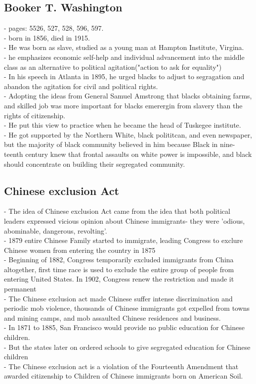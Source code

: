 \documentclass{article}
\begin{document}
\subsection{ Booker T. Washington}
- pages: 5526, 527, 528, 596, 597.\\
- born in 1856, died in 1915.\\
- He was born as slave, studied as a young man at Hampton Institute, Virgina.\\
- he emphasizes economic self-help and individual advancement into the middle class as an alternative to political agitation("action to ask for equality")\\
- In his speech in Atlanta in 1895, he urged blacks to adjust to segragation and abandon the agitation for civil and political rights.\\
-  Adopting the ideas from General Samuel Amstrong that blacks obtaining farms, and skilled job was more important for blacks emerergin from slavery than the rights of citizenship.\\
- He put this view to practice when he became the head of Tuskegee institute.\\
- He got supported by the Northern White, black polititcan, and even newspaper, but the majority of black community believed in him because Black in nine-teenth century knew that frontal assaults on white power is impossible, and black should concentrate on building their segregated community.\\

\subsection{ Chinese exclusion Act}
- The idea of Chinese exclusion Act came from the idea that both political leaders expressed vicious opinion about Chinese immigrants- they were 'odious, abominable, dangerous, revolting'.\\
- 1879 entire Chinese Family started to immigrate, leading Congress to exclure Chinese women from entering the country in 1875\\
- Beginning of 1882, Congress temporarily excluded immigrants from China altogether, first time race is used to exclude the entire group of people from entering United States. In 1902, Congress renew the restriction and made it permanent\\
- The Chinese exclusion act made Chinese suffer intense discrimination and periodic mob violence, thousands of Chinese immigrants got expelled from towns and mining camps, and mob assaulted Chinese residences and business. \\
- In 1871 to 1885, San Francisco would provide no public education for Chinese children.\\
- But the states later on ordered schools to give segregated education for Chinese children\\
- The Chinese exclusion act is a violation of the Fourteenth Amendment that awarded citizenship to Children of Chinese immigrants born on American Soil.
\end{document}
